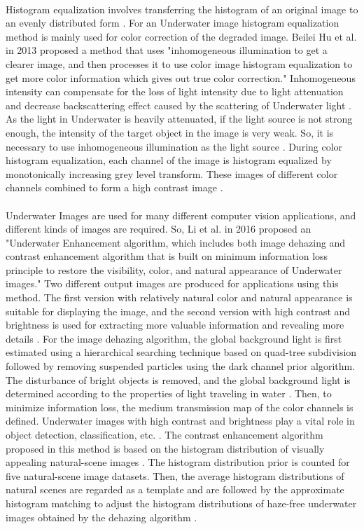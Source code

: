 \documentclass[a4paper,11pt,oneside]{article}
\begin{document}
  \\
  Histogram equalization involves transferring the histogram of an original image to an evenly distributed form \cite{1}. For an Underwater image histogram equalization method is mainly used for color correction of the degraded image. Beilei Hu et al. \cite{1} in 2013 proposed a method that uses "inhomogeneous illumination to get a clearer image, and then processes it to use color image histogram equalization to get more color information which gives out true color correction." Inhomogeneous intensity can compensate for the loss of light intensity due to light attenuation and decrease backscattering effect caused by the scattering of Underwater light \cite{1}. As the light in Underwater is heavily attenuated, if the light source is not strong enough, the intensity of the target object in the image is very weak. So, it is necessary to use inhomogeneous illumination as the light source \cite{1}. During color histogram equalization, each channel of the image is histogram equalized by monotonically increasing grey level transform. These images of different color channels combined to form a high contrast image \cite{1}.\\
  \\
   Underwater Images are used for many different computer vision applications, and different kinds of images are required. So, Li et al. in 2016 \cite{21} proposed an "Underwater Enhancement algorithm, which includes both image dehazing and contrast enhancement algorithm that is built on minimum information loss principle to restore the visibility, color, and natural appearance of Underwater images." Two different output images are produced for applications using this method. The first version with relatively natural color and natural appearance is suitable for displaying the image, and the second version with high contrast and brightness is used for extracting more valuable information and revealing more details \cite{21}. For the image dehazing algorithm, the global background light is first estimated using a hierarchical searching technique based on quad-tree subdivision followed by removing suspended particles using the dark channel prior algorithm. The disturbance of bright objects is removed, and the global background light is determined according to the properties of light traveling in water \cite{21}. Then, to minimize information loss, the medium transmission map of the color channels is defined. Underwater images with high contrast and brightness play a vital role in object detection, classification, etc. \cite{21}. The contrast enhancement algorithm proposed in this method is based on the histogram distribution of visually appealing natural-scene images \cite{21}. The histogram distribution prior is counted for five natural-scene image datasets. Then, the average histogram distributions of natural scenes are regarded as a template and are followed by the approximate histogram matching to adjust the histogram distributions of haze-free underwater images obtained by the dehazing algorithm \cite{21}.\\
\end{document}
